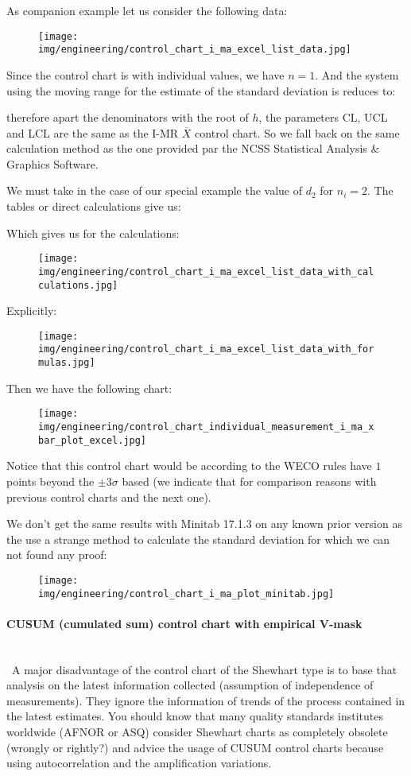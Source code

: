 	As companion example let us consider the following data:
	\begin{figure}[H]
		\centering
		\texttt{[image: img/engineering/control\_chart\_i\_ma\_excel\_list\_data.jpg]}
	\end{figure}
	Since the control chart is with individual values, we have $n=1$. And the system using the moving range for the estimate of the standard deviation is reduces to:
	
	therefore apart the denominators with the root of $h$, the parameters CL, UCL and LCL are the same as the I-MR $\overline{X}$ control chart. So we fall back on the same calculation method as the one provided par the NCSS Statistical Analysis \& Graphics Software.
	
	We must take in the case of our special example the value of $d_2$ for $n_i=2$. The tables or direct calculations give us:
	
	Which gives us for the calculations:
	\begin{figure}[H]
		\centering
		\texttt{[image: img/engineering/control\_chart\_i\_ma\_excel\_list\_data\_with\_calculations.jpg]}
	\end{figure}
	Explicitly:
	\begin{figure}[H]
		\centering
		\texttt{[image: img/engineering/control\_chart\_i\_ma\_excel\_list\_data\_with\_formulas.jpg]}
	\end{figure}
	Then we have the following chart:
	\begin{figure}[H]
		\centering
		\texttt{[image: img/engineering/control\_chart\_individual\_measurement\_i\_ma\_xbar\_plot\_excel.jpg]}
	\end{figure}
	Notice that this control chart would be according to the WECO rules have $1$ points beyond the $\pm 3\sigma$ based (we indicate that for comparison reasons with previous control charts and the next one).
	
	We don't get the same results with Minitab 17.1.3 on any known prior version as the use a strange method to calculate the standard deviation for which we can not found any proof:
	\begin{figure}[H]
		\centering
		\texttt{[image: img/engineering/control\_chart\_i\_ma\_plot\_minitab.jpg]}
	\end{figure}
	
	\paragraph{CUSUM (cumulated sum) control chart with empirical V-mask}\mbox{}\\\
	A major disadvantage of the control chart of the Shewhart type is to base that analysis on the latest information collected (assumption of independence of measurements). They ignore the information of trends of the process contained in the latest estimates. You should know that many quality standards institutes worldwide (AFNOR or ASQ) consider Shewhart charts as completely obsolete (wrongly or rightly?) and advice the usage of CUSUM control charts because using autocorrelation and the amplification variations.

